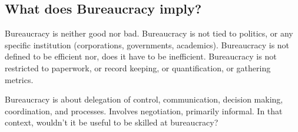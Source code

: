 \subsection{What does Bureaucracy imply?}
Bureaucracy is neither good nor bad. Bureaucracy is not tied to politics, or any specific institution (corporations, governments, academics). Bureaucracy is not defined to be efficient nor, does it have to be inefficient. Bureaucracy is not restricted to paperwork, or record keeping, or quantification, or gathering metrics. 

Bureaucracy is about delegation of control, communication, decision making, coordination, and processes. Involves negotiation, primarily informal. In that context, wouldn't it be useful to be skilled at bureaucracy? 